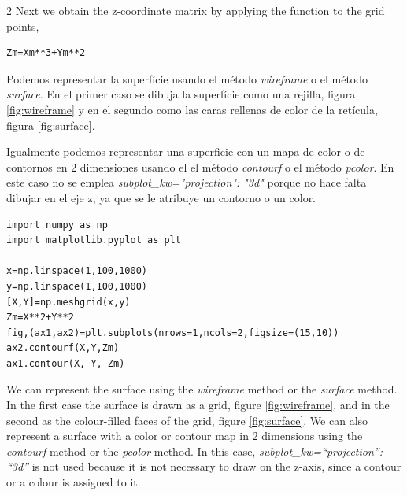 \begin{paracol} {2}
Next we obtain the z-coordinate matrix by applying the function to the grid points,

\begin{verbatim}
Zm=Xm**3+Ym**2
\end{verbatim}

\switchcolumn
Podemos representar la superfície usando el método \textit{wireframe} o el método \textit{surface}. En el primer caso se dibuja la superfície como una rejilla, figura \ref{fig:wireframe} y en el segundo como las caras rellenas de color de la retícula, figura \ref{fig:surface}.

Igualmente podemos representar una superficie con un mapa de color o de contornos en 2 dimensiones usando el el método \textit{contourf} o el método \textit{pcolor}. En este caso no se emplea \textit{subplot\_kw="projection": "3d"} porque no hace falta dibujar en el eje z, ya que se le atribuye un contorno o un color.

\begin{verbatim}
import numpy as np
import matplotlib.pyplot as plt

x=np.linspace(1,100,1000)
y=np.linspace(1,100,1000)
[X,Y]=np.meshgrid(x,y)
Zm=X**2+Y**2
fig,(ax1,ax2)=plt.subplots(nrows=1,ncols=2,figsize=(15,10))
ax2.contourf(X,Y,Zm)
ax1.contour(X, Y, Zm)
\end{verbatim}

\switchcolumn

We can represent the surface using the \textit{wireframe} method or the \textit{surface} method. In the first case the surface is drawn as a grid, figure \ref{fig:wireframe}, and in the second as the colour-filled faces of the grid, figure \ref{fig:surface}.
We can also represent a surface with a color or contour map in 2 dimensions using the \textit{contourf} method or the \textit{pcolor} method. In this case, \textit{subplot\_kw=“projection”: “3d”} is not used because it is not necessary to draw on the z-axis, since a contour or a colour is assigned to it.
\end{paracol}

